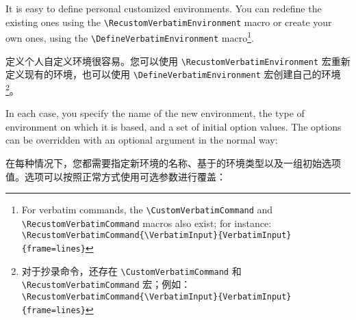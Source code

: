 \documentclass[twoside]{article}
\newif\ifChangeBar \ChangeBarfalse
\newcommand\cs[1]{\texttt{\textbackslash#1}}
\begin{document}
\ifChangeBar\begin{changebar}\fi
\VerbatimFootnotes
  It is easy to define personal customized environments. You can redefine
the existing ones using the \cs{RecustomVerbatimEnvironment} macro or create
your own ones, using the \cs{DefineVerbatimEnvironment} macro\footnote{%
\ifChangeBar\begin{changebar}\fi
For verbatim commands, the \cs{CustomVerbatimCommand} and
\cs{RecustomVerbatimCommand} macros also exist; for instance:
\\\noindent
\verb+\RecustomVerbatimCommand{\VerbatimInput}{VerbatimInput}{frame=lines}+
\ifChangeBar\end{changebar}\fi}.

定义个人自定义环境很容易。您可以使用 \cs{RecustomVerbatimEnvironment} 宏重新定义现有的环境，也可以使用 \cs{DefineVerbatimEnvironment} 宏创建自己的环境\footnote{%
\ifChangeBar\begin{changebar}\fi
  对于抄录命令，还存在 \cs{CustomVerbatimCommand} 和 \cs{RecustomVerbatimCommand} 宏；例如：
\\\noindent
\verb+\RecustomVerbatimCommand{\VerbatimInput}{VerbatimInput}{frame=lines}+
\ifChangeBar\end{changebar}\fi}。


In each case, you specify the name of the new environment, the type of
environment on which it is based, and a set of initial option values. The
options can be overridden with an optional argument in the normal way:

在每种情况下，您都需要指定新环境的名称、基于的环境类型以及一组初始选项值。选项可以按照正常方式使用可选参数进行覆盖：
\ifChangeBar\end{changebar}\fi


\end{document}
